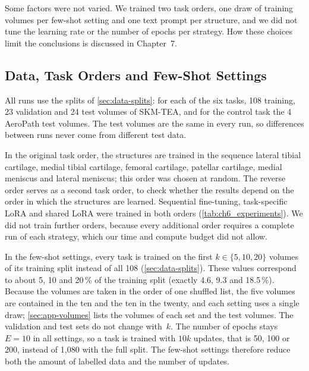 Some factors were not varied.
We trained two task orders, one draw of training volumes per few-shot setting and one text prompt per structure, and we did not tune the learning rate or the number of epochs per strategy.
How these choices limit the conclusions is discussed in Chapter~7.

\begin{table}[tb]
\centering
\caption[Overview of the experiments]{Overview of the experiments. Each configuration was trained once. Training volumes per task: 108 is the full training split. Objective: number of the research objective stated in the introduction. All runs use the original task order unless stated otherwise.}
\label{tab:ch6_experiments}

\end{table}

\subsection{Data, Task Orders and Few-Shot Settings}
\label{subsec:exp-data}

All runs use the splits of \cref{sec:data-splits}: for each of the six tasks, 108 training, 23 validation and 24 test volumes of SKM-TEA, and for the control task the 4 AeroPath test volumes.
The test volumes are the same in every run, so differences between runs never come from different test data.

In the original task order, the structures are trained in the sequence lateral tibial cartilage, medial tibial cartilage, femoral cartilage, patellar cartilage, medial meniscus and lateral meniscus; this order was chosen at random.
The reverse order serves as a second task order, to check whether the results depend on the order in which the structures are learned.
Sequential fine-tuning, task-specific LoRA and shared LoRA were trained in both orders (\cref{tab:ch6_experiments}).
We did not train further orders, because every additional order requires a complete run of each strategy, which our time and compute budget did not allow.

In the few-shot settings, every task is trained on the first $k \in \{5, 10, 20\}$ volumes of its training split instead of all 108 (\cref{sec:data-splits}).
These values correspond to about 5, 10 and 20\,\% of the training split (exactly 4.6, 9.3 and 18.5\,\%).
Because the volumes are taken in the order of one shuffled list, the five volumes are contained in the ten and the ten in the twenty, and each setting uses a single draw; \cref{sec:app-volumes} lists the volumes of each set and the test volumes.
The validation and test sets do not change with~$k$.
The number of epochs stays $E = 10$ in all settings, so a task is trained with $10k$ updates, that is 50, 100 or 200, instead of 1{,}080 with the full split.
The few-shot settings therefore reduce both the amount of labelled data and the number of updates.

